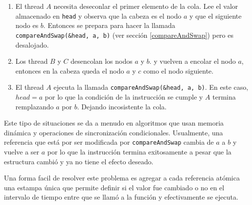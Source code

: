 \begin{enumerate}
	\item El thread $A$ necesita deseconlar el primer elemento de la cola. Lee el valor almacenado en \texttt{head} y  observa que la cabeza es el nodo $a$ y que el siguiente nodo es $b$. Entonces se prepara para hacer la llamada \texttt{compareAndSwap(\&head, a, b)} (ver sección \ref{compareAndSwap}) pero es desalojado.
	\item Los thread $B$ y $C$ desencolan los nodos $a$ y $b$. y vuelven a encolar el nodo $a$, entonces en la cabeza queda el nodo $a$ y $c$ como el nodo siguiente.
	\item El thread $A$ ejecuta la llamada  \texttt{compareAndSwap(\&head, a, b)}. En este caso, $head = a$ por lo que la condición de la instrucción se cumple y $A$ termina remplazando $a$ por $b$. Dejando incosistente la cola.
\end{enumerate}

Este tipo de situaciones se da a menudo en algoritmos que usan memoria dinámica y operaciones de sincronización  condicionales. Usualmente, una referencia que está por ser modificada por \texttt{compareAndSwap} cambia de $a$ a $b$ y vuelve a ser $a$ por lo que la instrucción termina exitosamente a pesar que la estructura cambió y ya no tiene el efecto deseado.

Una forma facil de resolver este problema es agregar a cada referencia atómica una estampa única que permite definir si el valor fue cambiado o no en el intervalo de tiempo entre que se llamó a la función y efectivamente se ejecuta.

\printbibliography[keyword=progConcurr,title=Bibliografía]
